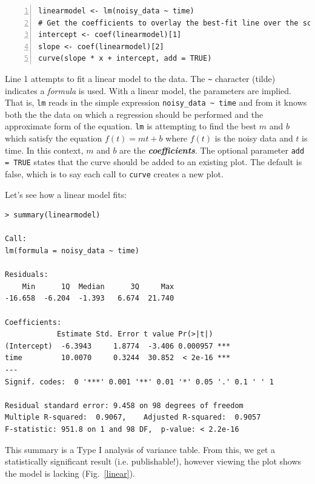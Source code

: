 \documentclass[12pt]{article}
\theoremstyle{remark}
\newcommand{\vocab}[1]{\textbf{\emph{#1}}}
\begin{document}
\begin{Verbatim}[frame=single, fontsize=\small, numbers=left]
linearmodel <- lm(noisy_data ~ time)
# Get the coefficients to overlay the best-fit line over the scatterplot
intercept <- coef(linearmodel)[1]
slope <- coef(linearmodel)[2]
curve(slope * x + intercept, add = TRUE)
\end{Verbatim}

Line 1 attempts to fit a linear model to the data. The \verb|~| character (tilde) indicates a \emph{formula} is used. With a linear model, the parameters are implied. That is, \verb|lm| reads in the simple expression \verb|noisy_data ~ time| and from it knows both the the data on which a regression should be performed and the approximate form of the equation. \verb|lm| is attempting to find the best $m$ and $b$ which satisfy the equation $f(t) = mt + b$ where $f(t)$ is the noisy data and $t$ is time. In this context, $m$ and $b$ are the \vocab{coefficients}. The optional parameter \verb|add = TRUE| states that the curve should be added to an existing plot. The default is false, which is to say each call to \verb|curve| creates a new plot.

Let's see how a linear model fits:

\begin{Verbatim}[frame=single, fontsize=\small]
> summary(linearmodel)

Call:
lm(formula = noisy_data ~ time)

Residuals:
    Min      1Q  Median      3Q     Max 
-16.658  -6.204  -1.393   6.674  21.740 

Coefficients:
            Estimate Std. Error t value Pr(>|t|)    
(Intercept)  -6.3943     1.8774  -3.406 0.000957 ***
time         10.0070     0.3244  30.852  < 2e-16 ***
---
Signif. codes:  0 '***' 0.001 '**' 0.01 '*' 0.05 '.' 0.1 ' ' 1

Residual standard error: 9.458 on 98 degrees of freedom
Multiple R-squared:  0.9067,	Adjusted R-squared:  0.9057 
F-statistic: 951.8 on 1 and 98 DF,  p-value: < 2.2e-16
\end{Verbatim}
This summary is a Type I analysis of variance table. From this, we get a statistically significant result (i.e. publishable!), however viewing the plot shows the model is lacking (Fig.~\ref{linear}).
\end{document}
